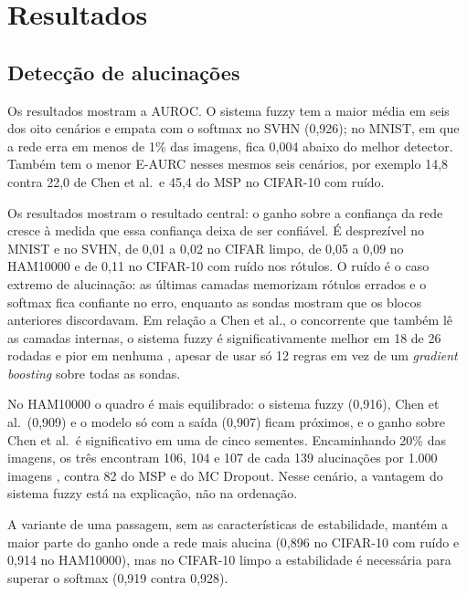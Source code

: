 \documentclass[conference,a4paper]{IEEEtran}
\begin{document}
\section{Resultados}


\subsection{Detecção de alucinações}
Os resultados mostram a AUROC. O sistema fuzzy tem a maior média em seis dos oito cenários e empata com o softmax no SVHN (0,926);
no MNIST, em que a rede erra em menos de 1\% das imagens, fica 0,004 abaixo do melhor detector. Também tem o menor E-AURC nesses mesmos seis
cenários, por exemplo 14,8 contra 22,0 de Chen et al.\ e 45,4 do MSP no CIFAR-10 com ruído.

Os resultados mostram o resultado central: o ganho sobre a confiança da rede cresce à medida que essa confiança deixa de ser
confiável. É desprezível no MNIST e no SVHN, de 0,01 a 0,02 no CIFAR limpo, de 0,05 a 0,09 no HAM10000 e de 0,11 no CIFAR-10 com ruído nos
rótulos. O ruído é o caso extremo de alucinação: as últimas camadas memorizam rótulos errados e o softmax fica confiante no erro, enquanto
as sondas mostram que os blocos anteriores discordavam. Em relação a Chen et al., o concorrente que também lê as camadas internas, o sistema
fuzzy é significativamente melhor em 18 de 26 rodadas e pior em nenhuma , apesar de usar só 12 regras em vez de um
\textit{gradient boosting} sobre todas as sondas.

No HAM10000 o quadro é mais equilibrado: o sistema fuzzy (0,916), Chen et al.\ (0,909) e o modelo só com a saída (0,907) ficam próximos, e o
ganho sobre Chen et al.\ é significativo em uma de cinco sementes. Encaminhando 20\% das imagens, os três encontram 106, 104 e 107 de cada 139
alucinações por 1.000 imagens , contra 82 do MSP e do MC Dropout. Nesse cenário, a vantagem do sistema fuzzy está
na explicação, não na ordenação.

A variante de uma passagem, sem as características de estabilidade, mantém a maior parte do ganho onde a rede mais alucina (0,896 no CIFAR-10
com ruído e 0,914 no HAM10000), mas no CIFAR-10 limpo a estabilidade é necessária para superar o softmax (0,919 contra 0,928).
\end{document}
